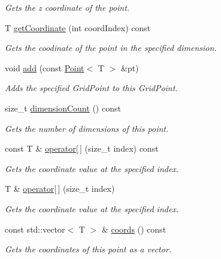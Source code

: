 \begin{DoxyCompactItemize}
\begin{DoxyCompactList}\small\item\em Gets the z coordinate of the point. \end{DoxyCompactList}\item 
T \hyperlink{classrepast_1_1_point_a22a3eab287df785225791d1d1a75c89c}{get\-Coordinate} (int coord\-Index) const 
\begin{DoxyCompactList}\small\item\em Gets the coodinate of the point in the specified dimension. \end{DoxyCompactList}\item 
void \hyperlink{classrepast_1_1_point_a8b7e9df41c4aa2d7387138a404fc3982}{add} (const \hyperlink{classrepast_1_1_point}{Point}$<$ T $>$ \&pt)
\begin{DoxyCompactList}\small\item\em Adds the specified Grid\-Point to this Grid\-Point. \end{DoxyCompactList}\item 
size\-\_\-t \hyperlink{classrepast_1_1_point_ac872326f55cdbfa5106d430bea6d959c}{dimension\-Count} () const 
\begin{DoxyCompactList}\small\item\em Gets the number of dimensions of this point. \end{DoxyCompactList}\item 
const T \& \hyperlink{classrepast_1_1_point_a0ac1a3a42fc61f022d706a05238e98f1}{operator\mbox{[}$\,$\mbox{]}} (size\-\_\-t index) const 
\begin{DoxyCompactList}\small\item\em Gets the coordinate value at the specified index. \end{DoxyCompactList}\item 
T \& \hyperlink{classrepast_1_1_point_a1214b8f5293b222ff2bb115fe30127c2}{operator\mbox{[}$\,$\mbox{]}} (size\-\_\-t index)
\begin{DoxyCompactList}\small\item\em Gets the coordinate value at the specified index. \end{DoxyCompactList}\item 
const std\-::vector$<$ T $>$ \& \hyperlink{classrepast_1_1_point_ac821ebc5c69d6bf8ab132babddcbb864}{coords} () const 
\begin{DoxyCompactList}\small\item\em Gets the coordinates of this point as a vector. \end{DoxyCompactList}\item 

\end{DoxyCompactItemize}

